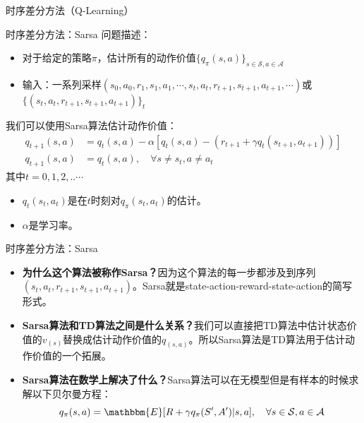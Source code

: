 \begin{section}{时序差分方法\alert{（Q-Learning）}}
\begin{frame}{时序差分方法：Sarsa}
    问题描述：
    \begin{itemize}
        \item 对于给定的策略$\pi$，估计所有的动作价值$\{q_\pi(s, a)\}_{s\in \mathcal{S}, a\in\mathcal{A}}$
        \item 输入：一系列采样\alert{$(s_0, a_0, r_1, s_1, a_1,\cdots,s_t, a_t, r_{t+1}, s_{t+1}, a_{t+1},\cdots)$}或$\{(s_t, a_t, r_{t+1}, s_{t+1}, a_{t+1})\}_t$
    \end{itemize}
    我们可以使用Sarsa算法估计动作价值：
    \[
        \begin{aligned}
            q_{t+1}(s,a)&=q_t(s,a)-\alpha[q_t(s,a)-(r_{t+1}+\gamma q_t(s_{t+1},a_{t+1}))] \\
            q_{t+1}(s,a)&=q_t(s,a), \quad \forall s\neq s_t, a\neq a_t
        \end{aligned}
    \]
    其中$t=0,1,2,..\cdots$
    \begin{itemize}
        \item $q_t(s_t,a_t)$是在$t$时刻对$q_\pi(s_t,a_t)$的估计。
        \item $\alpha$是学习率。
    \end{itemize}
\end{frame}

\begin{frame}{时序差分方法：Sarsa}
    \begin{itemize}
        \item \textbf{为什么这个算法被称作Sarsa？}因为这个算法的每一步都涉及到序列$(s_t, a_t, r_{t+1}, s_{t+1}, a_{t+1})$。Sarsa就是state-action-reward-state-action的简写形式。
        \item \textbf{Sarsa算法和TD算法之间是什么关系？}我们可以直接把TD算法中估计状态价值的$v_(s)$替换成估计动作价值的$q_(s,a)$。所以Sarsa算法是TD算法用于估计动作价值的一个拓展。
        \item \textbf{Sarsa算法在数学上解决了什么？}Sarsa算法可以在\alert{无模型}但是\alert{有样本}的时候求解以下贝尔曼方程：
        \[
            q_\pi(s,a)=\mathbbm{E}[R+\gamma q_\pi(S',A')|s,a], \quad \forall s\in\mathcal{S}, a\in\mathcal{A}
        \]
    \end{itemize}   
\end{frame}


\end{section}
